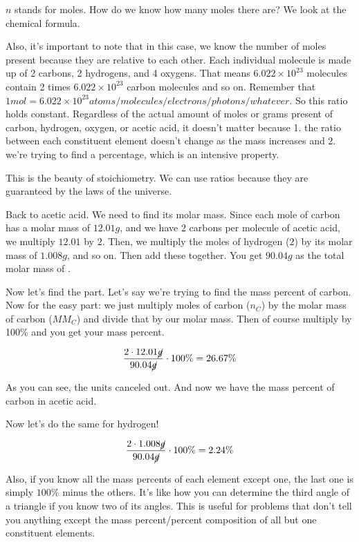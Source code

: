 \documentclass[letterpaper, 12pt]{article}
\begin{document}
$n$ stands for moles. How do we know how many moles there are? We look at the chemical formula.

Also, it's important to note that in this case, we know the number of moles present because they are relative to each other. Each individual  molecule is made up of 2 carbons, 2 hydrogens, and 4 oxygens. That means $6.022 \times 10^{23}$  molecules contain 2 times $6.022 \times 10^{23}$ carbon molecules and so on. Remember that $1 mol = 6.022 \times 10^{23} atoms/molecules/electrons/photons/whatever$. So this ratio holds constant. Regardless of the actual amount of moles or grams present of carbon, hydrogen, oxygen, or acetic acid, it doesn't matter because 1. the ratio between each constituent element doesn't change as the mass increases and 2. we're trying to find a percentage, which is an intensive property.

This is the beauty of stoichiometry. We can use ratios because they are guaranteed by the laws of the universe.

Back to acetic acid. We need to find its molar mass. Since each mole of carbon has a molar mass of $12.01 g$, and we have $2$ carbons per molecule of acetic acid, we multiply $12.01$ by $2$. Then, we multiply the moles of hydrogen ($2$) by its molar mass of $1.008 g$, and so on. Then add these together. You get $90.04 g$ as the total molar mass of .

Now let's find the part. Let's say we're trying to find the mass percent of carbon. Now for the easy part: we just multiply moles of carbon ($n_{C}$) by the molar mass of carbon ($MM_{C}$) and divide that by our molar mass. Then of course multiply by 100\% and you get your mass percent.

$$\frac{2 \cdot 12.01 \cancel{g}}{90.04 \cancel{g}} \cdot 100\% = 26.67\%$$

As you can see, the units canceled out. And now we have the mass percent of carbon in acetic acid.

Now let's do the same for hydrogen!

$$\frac{2 \cdot 1.008 \cancel{g}}{90.04 \cancel{g}} \cdot 100\% = 2.24\%$$

Also, if you know all the mass percents of each element except one, the last one is simply $100\%$ minus the others. It's like how you can determine the third angle of a triangle if you know two of its angles. This is useful for problems that don't tell you anything except the mass percent/percent composition of all but one constituent elements.
\end{document}
